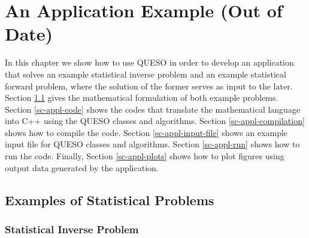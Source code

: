 \chapter{An Application Example (Out of Date)}\label{ch-appl-example}
\thispagestyle{headings}

In this chapter we show how to use QUESO in order to develop an application that solves
an example statistical inverse problem and
an example statistical forward problem,
where the solution of the former serves as input to the later.
Section \ref{sc-examples} gives the mathematical formulation of both example problems.
Section \ref{sc-appl-code} shows the codes that translate the mathematical language into C++ using the QUESO classes and algorithms.
Section \ref{sc-appl-compilation} shows how to compile the code.
Section \ref{sc-appl-input-file} shows an example input file for QUESO classes and algorithms.
Section \ref{sc-appl-run} shows how to run the code.
Finally, Section \ref{sc-appl-plots} shows how to plot figures using output data generated by the application.

\clearpage
\section{Examples of Statistical Problems}\label{sc-examples}

\subsection{Statistical Inverse Problem}

